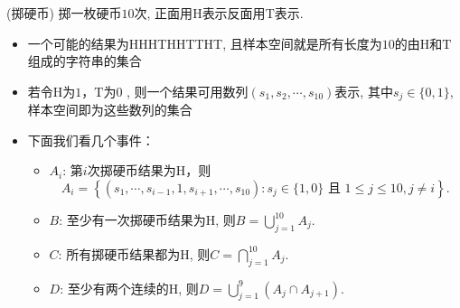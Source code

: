 \documentclass[Prob-All.tex]{subfiles}
\begin{document}
\begin{frame}
	 \begin{exam} (掷硬币) 掷一枚硬币$10$次, 正面用${\mathrm{H}}$表示反面用${\mathrm{T}}$表示.
	 	    \begin{itemize}[<+-|alert@+>]
	 	    	\item 一个可能的结果为{\rm HHHTHHTTHT}, \pause 且样本空间就是所有长度为$10$的由${\mathrm{H}}$和${\mathrm{T}}$组成的字符串的集合
	 	    	\item 若令${\mathrm{H}}$为$1$，${\mathrm{T}}$为$0$ , 则一个结果可用数列${\left(s_{1}, s_{2}, \cdots, s_{10}\right)}$表示, 其中${s_{j} \in\{0,1\}}$, 样本空间即为这些数列的集合
	 	    	\item 下面我们看几个事件：
   		 	    \begin{itemize}[<+-|alert@+>]
	\item ${A_{i}}$: 第$i$次掷硬币结果为${\mathrm{H}}$，则\pause
	\[
	A_{i}=\left\{\left(s_{1}, \cdots, s_{i-1}, 1, s_{i+1}, \cdots, s_{10}\right): s_{j} \in\{1,0\} \text{ 且 } 1 \leqslant j \leqslant 10, j\neq i\right\}.
	\]
	\item %
	${B}$: 至少有一次掷硬币结果为${\mathrm{H}}$, 则\pause $B=\bigcup_{j=1}^{10} A_{j}.$
	\item ${C}$: 所有掷硬币结果都为${\mathrm{H}}$, 则\pause $C=\bigcap_{j=1}^{10} A_{j}.$
	\item ${D}$: 至少有两个连续的${\mathrm{H}}$,  则\pause $D=\bigcup_{j=1}^{9}\left(A_{j} \cap A_{j+1}\right).$
	    \end{itemize}
    	    \end{itemize}
	  \end{exam}
\end{frame}
\end{document}

